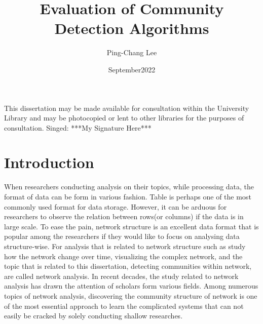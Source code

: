 \documentclass[12pt]{article}
\title{Evaluation of Community Detection Algorithms}
\author{Ping-Chang Lee}
\affil{MSc in Data Science \& Statistics \\ The University of Bath}
\date{{September}{2022}}
\begin{document}
\maketitle
\pagebreak

    
\bigbreak\bigbreak\bigbreak
\bigbreak\bigbreak\bigbreak
\bigbreak\bigbreak\bigbreak

This dissertation may be made available for consultation within the University Library and may be photocopied or lent to other libraries for the purposes of consultation.
\bigbreak\bigbreak\bigbreak
Singed: ***My Signature Here***
\pagebreak


\tableofcontents
\pagebreak

\section{Introduction}
When researchers conducting analysis on their topics, while processing data, the format of data can be form in various fashion. Table is perhaps one of the most commonly used format for data storage. However, it can be arduous for researchers to observe the relation between rows(or columns) if the data is in large scale. To ease the pain, network structure is an excellent data format that is popular among the researchers if they would like to focus on analysing data structure-wise. For analysis that is related to network structure such as study how the network change over time, visualizing the complex network, and the topic that is related to this dissertation, detecting communities within network, are called network analysis. In recent decades, the study related to network analysis has drawn the attention of scholars form various fields. Among numerous topics of network analysis, discovering the community structure of network is one of the most essential approach to learn the complicated systems that can not easily be cracked by solely conducting shallow researches\cite{1}. 

\bigskip
\end{document}
